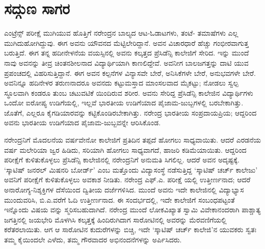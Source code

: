 
\chapter{ಸದ್ಗುಣ ಸಾಗರ}

\noindent

ಎಂಟ್ರೆನ್ಸ್ ಪರೀಕ್ಷೆ ಮುಗಿಯುವ ಹೊತ್ತಿಗೆ ನರೇಂದ್ರನ ಬಾಲ್ಯದ ಆಟ-ಓಡಾಟಗಳು, ತಂಟೆ- ತಮಾಷೆಗಳು ಎಲ್ಲ ಮುಗಿದುಹೋಗಿದ್ದುವು. ಈಗ ಅವನು ಯೌವನದ ಮೆಟ್ಟಿಲೇರಿದ್ದಾನೆ. ಅವನ ವಿಚಾರಧಾರೆ ಹೆಚ್ಚು ಗಂಭೀರವಾಗುತ್ತ ಬರುತ್ತಿದೆ. ಈಗ ತನ್ನ ಹದೀನೇಳನೆಯ ವಯಸ್ಸಿನಲ್ಲಿ ಅವನು ಕಲ್ಕತ್ತದ ಪ್ರೆಸಿಡೆನ್ಸಿ ಕಾಲೇಜಿಗೆ ಸೇರಿದ. ಇನ್ನು ಮುಂದೆ ನಾವು ಅವನನ್ನು ತೀವ್ರ ಚಿಂತನಶೀಲನಾದ ವಿದ್ಯಾರ್ಥಿಯಾಗಿ ಕಾಣಲಿದ್ದೇವೆ. ಅವನೀಗ ಬಾಲಜಗತ್ತನ್ನು ದಾಟಿ ಯುವ ಪ್ರಪಂಚದಲ್ಲಿ ವಿಹರಿಸುತ್ತಿದ್ದಾನೆ. ಈಗ ಅವನ ಕಲ್ಪನೆಗಳ ವಿನ್ಯಾಸವೇ ಬೇರೆ, ಅನಿಸಿಕೆಗಳೇ ಬೇರೆ, ಅನುಭವಗಳೇ ಬೇರೆ. ಅವನಿನ್ನೂ ಹದಿನೇಳರ ತರುಣನಾದರೂ ಅವನದು ಕಟ್ಟುಮಸ್ತಾದ ಮಾಂಸಲವಾದ ಮೈಕಟ್ಟು; ನೋಡಲು ಸ್ವಲ್ಪ ಸ್ಥೂಲವಾಗಿ ಕಂಡರೂ ತುಂಬ ಚಟುವಟಿಕೆ ಯಿಂದಿರುವ ಶರೀರ. ಅವನು ಸೇರಿದ್ದ ಪ್ರೆಸಿಡೆನ್ಸಿ ಕಾಲೇಜಿನ ವಿದ್ಯಾರ್ಥಿಗಳು ಒಂದೋ ಐರೋಪ್ಯ ಉಡಿಗೆಯಲ್ಲಿ, ಇಲ್ಲವೆ ಭಾರತೀಯ ಉಡಿಗೆಯಾದ ಪೈಜಾಮ-ಜುಬ್ಬಗಳಲ್ಲಿ ಬರಬೇಕಾಗಿತ್ತು. ಜೊತೆಗೆ, ಎಲ್ಲರೂ ಕೈಗಡಿಯಾರವನ್ನು ಕಟ್ಟಿಕೊಂಡಿರಬೇಕಾಗಿತ್ತು. ನರೇಂದ್ರ ಭಾರತೀಯ ಸಂಪ್ರದಾಯಪ್ರಿಯ; ಆದ್ದರಿಂದ ಅವನು ಭಾರತೀಯ ಉಡಿಗೆಯಾದ ಪೈಜಾಮ-ಜುಬ್ಬವನ್ನೇ ಆರಿಸಿಕೊಂಡ.

ನರೇಂದ್ರನಿಗೆ ಮೊದಲನೆಯ ವರ್ಷವೇನೋ ಕಾಲೇಜಿಗೆ ಪ್ರತಿದಿನ ತಪ್ಪದೆ ಹೋಗಲು ಸಾಧ್ಯವಾಯಿತು. ಆದರೆ ಎರಡನೆಯ ವರ್ಷ ಮಲೇರಿಯಾ ಜ್ವರ ಹಿಡಿದು, ಸರಿಯಾಗಿ ಹೋಗಲು ಸಾಧ್ಯವಾಗದೆ, ಹಾಜರಿ ಕಡಿಮೆಯಾಯಿತು. ಆದ್ದರಿಂದ ಪರೀಕ್ಷೆಗೆ ಕುಳಿತುಕೊಳ್ಳಲು ಪ್ರೆಸಿಡೆನ್ಸಿ ಕಾಲೇಜಿನಲ್ಲಿ ನರೇಂದ್ರನಿಗೆ ಅನುಮತಿ ಸಿಗಲಿಲ್ಲ. ಆದರೆ ಅವನ ಅದೃಷ್ಟಕ್ಕೆ. ‘ಸ್ಕಾಟಿಷ್ ಜನರಲ್ ಮಿಷನರಿ ಬೋರ್ಡ್’ ಎಂಬ ಮತ್ತೊಂದು ವಿದ್ಯಾಸಂಸ್ಥೆ ನಡೆಸುತ್ತಿದ್ದ ‘ಸ್ಕಾಟಿಷ್ ಚರ್ಚ್ ಕಾಲೇಜು’ ಅವನಿಗೆ ಪರೀಕ್ಷೆಗೆ ಕುಳಿತುಕೊಳ್ಳಲು ಅವಕಾಶ ನೀಡಿತು. ನರೇಂದ್ರ ಎಫ್.ಎ. ಪರೀಕ್ಷೆ ಯಲ್ಲಿ ಉತ್ತೀರ್ಣನಾದ; ಆದರೆ ಅನಾರೋಗ್ಯ-ನಿಶ್ಶಕ್ತಿಗಳ ದೆಸೆಯಿಂದ ದ್ವಿತೀಯ ದರ್ಜೆಗಳಿಸಿದ. ಮುಂದೆ ಅವನು ಇದೇ ಕಾಲೇಜಿನಲ್ಲಿ ವಿದ್ಯಾಭ್ಯಾಸ ಮುಂದುವರಿಸಿ, ಬಿ.ಎ.ವರೆಗೆ ಓದಿ ಉತ್ತೀರ್ಣನಾದ. ಈ ಸಂದರ್ಭದಲ್ಲಿ, ಇದೇ ಕಾಲೇಜಿಗೆ ಸಂಬಂಧಪಟ್ಟಂತೆ ಇನ್ನೊಂದು ವಿಷಯ ವನ್ನು ಸ್ಮರಿಸಬಹುದಾಗಿದೆ. ನರೇಂದ್ರ ಮುಂದೆ ಲೋಕವಿಖ್ಯಾತ ಸ್ವಾಮಿ ವಿವೇಕಾನಂದರಾಗಿ ಪಾಶ್ಚಾತ್ಯ ಜಗತ್ತಿನಲ್ಲಿ ಜಯಭೇರಿ ಮೊಳಗಿಸಿ ಕಲ್ಕತ್ತಕ್ಕೆ ಹಿಂದಿರುಗಿದಾಗ ಸಾರೋಟಿನಲ್ಲಿ ಅವರನ್ನು ಮೆರವಣಿಗೆಯಲ್ಲಿ ಕರೆತರಲಾಯಿತು. ಆಗ ಆ ಸಾರೋಟಿನ ಕುದುರೆಗಳನ್ನು ಬಿಚ್ಚಿ, ಇದೇ ‘ಸ್ಕಾಟಿಷ್ ಚರ್ಚ್ ಕಾಲೇಜಿ’ನ ಯುವಕರು ಸ್ವತಃ ತಮ್ಮ ಕೈಯಿಂದಲೇ ಎಳೆದು, ತಮ್ಮ ಗೌರವಾದರ ಅಭಿನಂದನೆಗಳನ್ನು ಅರ್ಪಿಸಿದರು.

